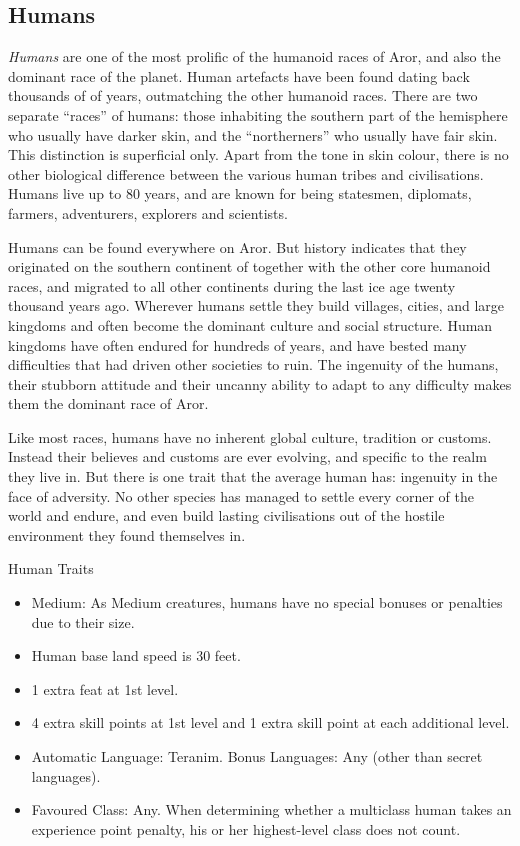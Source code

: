 \subsection{Humans}
\label{sec:Humans}

\emph{Humans} are one of the most prolific of the humanoid races of Aror, and
also the dominant race of the planet. Human artefacts have been found dating
back thousands of of years, outmatching the other humanoid races. There are
two separate ``races'' of humans: those inhabiting the southern part of the
hemisphere who usually have darker skin, and the ``northerners'' who usually
have fair skin. This distinction is superficial only. Apart from the tone in
skin colour, there is no other biological difference between the various human
tribes and civilisations. Humans live up to 80 years, and are known for being
statesmen, diplomats, farmers, adventurers, explorers and scientists.

Humans can be found everywhere on Aror. But history indicates that they
originated on the southern continent of  together with the
other core humanoid races, and migrated to all other continents during the
last ice age twenty thousand years ago. Wherever humans settle they build
villages, cities, and large kingdoms and often become the dominant culture and
social structure. Human kingdoms have often endured for hundreds of years, and
have bested many difficulties that had driven other societies to ruin. The
ingenuity of the humans, their stubborn attitude and their uncanny ability to
adapt to any difficulty makes them the dominant race of Aror.

Like most races, humans have no inherent global culture, tradition or customs.
Instead their believes and customs are ever evolving, and specific to the
realm they live in. But there is one trait that the average human has: ingenuity
in the face of adversity. No other species has managed to settle every corner
of the world and endure, and even build lasting civilisations out of the
hostile environment they found themselves in.

\begin{35e}{Human Traits}
  \begin{itemize}[noitemsep]
  \item Medium: As Medium creatures, humans have no special bonuses or
    penalties due to their size.
  \item Human base land speed is 30 feet.
  \item 1 extra feat at 1st level.
  \item 4 extra skill points at 1st level and 1 extra skill point at each
    additional level.
  \item Automatic Language: Teranim. Bonus Languages: Any (other than secret
    languages).
  \item Favoured Class: Any. When determining whether a multiclass human takes
    an experience point penalty, his or her highest-level class does not count.
  \end{itemize}
\end{35e}
